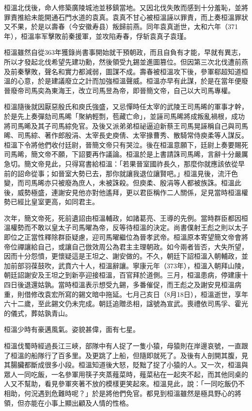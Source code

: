桓溫北伐後，命人修築廣陵城池並移鎮當地。又因北伐失敗而感到十分羞恥，並將罪責推給未能開通石門水道的袁真。袁真不甘心被桓溫誣以罪責，而上奏桓溫罪狀又不果，於是以壽春（今安徽寿县）叛歸前燕。同年袁真逝世，太和六年（371年），桓溫率军擊敗前秦援軍，並攻陷寿春，俘斩袁真子袁瑾。

桓溫雖然自從363年獲錄尚書事開始就干預朝政，而且自負有才能，早就有異志，所以才發起北伐希望先建功勳，然後領受九錫並進圖篡位。但因第三次北伐遭前燕及前秦擊敗，聲名和實力都減弱，圖謀不成。壽春被桓溫攻下後，參軍郗超知道桓溫的心意，於是建議廢立之計而加強桓溫聲威。桓溫亦早有此謀，於是在當年便廢晉廢帝司馬奕為東海王，改立司馬昱為帝，即晉簡文帝，自己以大司馬專權。

桓溫隨後就因厭惡殷氏和庾氏強盛，又忌憚時任太宰的武陵王司馬晞的軍事才幹，於是先上奏彈劾司馬晞「聚納輕剽，苞藏亡命」，並誣司馬晞將成叛亂禍根，成功將司馬晞及其子司馬綜免官。及後又派弟弟桓祕逼迫新蔡王司馬晃誣稱自己與司馬晞、司馬綜、著作郎殷涓、太宰長史庾倩、太宰掾曹秀、散騎常侍庾柔等人謀反。桓溫下令將他們收付廷尉，晉簡文帝只有哭泣。後在桓溫意願下，廷尉上奏要賜死司馬晞，簡文帝不願，下詔要再作議論。桓溫於是上書請誅司馬晞，言辭十分嚴厲急切。簡文帝見此，只得寫書給桓溫：「若果晉室國祚長久，那麼你就應該依從早前的詔命從事；如晉室大勢已去，那你就讓我退位讓賢吧。」桓溫見後，流汗色變，而司馬晞亦只被廢為庶人，未被誅殺。但庾柔、殷涓等人都被族誅。桓溫此後，威勢極盛，連謝安見他亦對他遙拜，更以君臣稱作二人關係，足見當時桓溫權勢已經比皇室更高，如同君主。

次年，簡文帝死，死前遺詔由桓溫輔政，如諸葛亮、王導的先例。當時群臣都因桓溫權勢而不敢以皇太子司馬曜為帝，反等待桓溫的決定。尚書僕射王彪之則以太子即位之正當性釋除群臣疑慮，迎司馬曜繼位為晉孝武帝。桓溫原本寄望簡文帝會將帝位禪讓給自己，或讓自己倣效周公為君主主理朝政。如今兩者皆否，大失所望，因而十分怨憤，更懷疑這是王坦之、謝安做的。不久，朝廷下詔桓溫入朝輔政，並加前部羽葆鼓吹，武賁六十人，桓溫辭讓。寧康元年（373年），桓溫入朝拜山陵，朝廷詔謝安及王坦之到新亭迎接桓溫，百官拜於道側。三月，桓溫患病，停建康十四日後退還姑孰。當時桓溫表示想受九錫，多番催促，而王彪之及謝安見桓溫病重，則借修改袁宏所寫的錫文暗中拖延。七月己亥日（8月18日），桓溫逝世，享年六十二歲，至此錫文仍未完成。朝廷追贈丞相，諡號為宣武。喪禮依司馬孚、霍光的儀式，葬姑孰青山。

桓溫少時有豪邁風氣。姿貌甚偉，面有七星。

桓溫伐蜀時經過長江三峽，部隊中有人捉了一隻小猿，母猿則在岸邊哀號，一直跟了桓溫的船隊行了百多里。及更跳了上船，但隨即就死了。及後有人剖開其腹，見其腸臟都斷成很多小段。桓溫知道後大怒，貶黜了捉了小猿的人。又一次，桓溫與眾人一同吃飯，一名參軍用筷子夾蒸薤菜時，薤菜秥在一起夾不起，而其他同桌的人又不幫助，看見參軍夾著不放的模樣更笑起來。桓溫見此，說：「一同吃飯仍不相助，何況遇到危難時呢？」於是將他們免官。都見到桓溫雖然是極具野心的將領，但亦能在小事上顯出顧及人情的性格。

